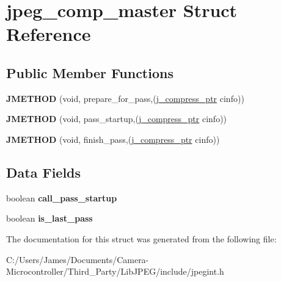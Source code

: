 \hypertarget{structjpeg__comp__master}{}\section{jpeg\+\_\+comp\+\_\+master Struct Reference}
\label{structjpeg__comp__master}
\subsection*{Public Member Functions}
\begin{DoxyCompactItemize}
\item 
\mbox{\label{structjpeg__comp__master_abd0c3c6fbff90f9d79eeab0addb6b657}} 
{\bfseries J\+M\+E\+T\+H\+OD} (void, prepare\+\_\+for\+\_\+pass,(\hyperlink{structjpeg__compress__struct}{j\+\_\+compress\+\_\+ptr} cinfo))
\item 
\mbox{\label{structjpeg__comp__master_a9f22f5f31a4669ed5bcfd07c71a9c79e}} 
{\bfseries J\+M\+E\+T\+H\+OD} (void, pass\+\_\+startup,(\hyperlink{structjpeg__compress__struct}{j\+\_\+compress\+\_\+ptr} cinfo))
\item 
\mbox{\label{structjpeg__comp__master_a4fc42934ec96f826aeeab057d3192a83}} 
{\bfseries J\+M\+E\+T\+H\+OD} (void, finish\+\_\+pass,(\hyperlink{structjpeg__compress__struct}{j\+\_\+compress\+\_\+ptr} cinfo))
\end{DoxyCompactItemize}
\subsection*{Data Fields}
\begin{DoxyCompactItemize}
\item 
\mbox{\label{structjpeg__comp__master_a24aadfdb7822164a99368e63ac12692e}} 
boolean {\bfseries call\+\_\+pass\+\_\+startup}
\item 
\mbox{\label{structjpeg__comp__master_a0bd8f60d8343715df098bd3e23e3f51d}} 
boolean {\bfseries is\+\_\+last\+\_\+pass}
\end{DoxyCompactItemize}


The documentation for this struct was generated from the following file\+:\begin{DoxyCompactItemize}
\item 
C\+:/\+Users/\+James/\+Documents/\+Camera-\/\+Microcontroller/\+Third\+\_\+\+Party/\+Lib\+J\+P\+E\+G/include/jpegint.\+h\end{DoxyCompactItemize}

